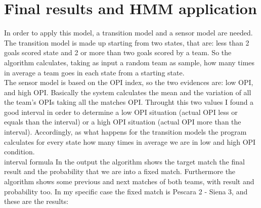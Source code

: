 \documentclass[a4paper,titlepage,11pt]{report}
\begin{document}
{\chapter{
Final results and HMM application}
In order to apply this model, a transition model and a sensor model are needed. The transition model is made up starting from two states, that are: less than 2 goals scored state and 2 or more than two goals scored by a team. So the algorithm calculates, taking as input a random team as sample, how many times in average a team goes in each state from a starting state.\\
The sensor model is based on the OPI index, so the two evidences are: low OPI, and high OPI. Basically the system calculates the mean and the variation of all the team's OPIs taking all the matches OPI. Throught this two values I found a good interval in order to determine a low OPI situation (actual OPI less or equals than the interval) or a high OPI situation (actual OPI more than the interval). Accordingly, as what happens  for the transition models the program calculates for every state how many times in average we are in low and high OPI condition.\\
interval formula
In the output the algorithm shows the target match the final result and the probability that we are into a fixed match. Furthermore the algorithm shows some previous and next matches of both teams, with result and probability too. In my specific case the fixed match is Pescara 2 - Siena 3, and these are the results:

}
\end{document}
